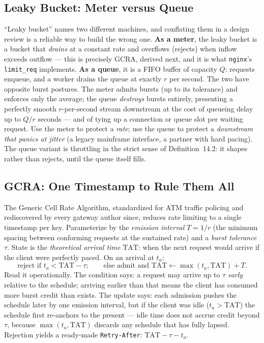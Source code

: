 \subsection{Leaky Bucket: Meter versus Queue}
\label{subsec:ch14-leaky-bucket}

``Leaky bucket'' names two different machines, and conflating them in a
design review is a reliable way to build the wrong one. \textbf{As a
meter}, the leaky bucket is a bucket that \emph{drains} at a constant rate
and overflows (rejects) when inflow exceeds outflow --- this is precisely
GCRA, derived next, and it is what \texttt{nginx}'s \texttt{limit\_req}
implements. \textbf{As a queue}, it is a FIFO buffer of capacity $Q$:
requests enqueue, and a worker drains the queue at exactly $r$ per second.
The two have opposite burst postures. The meter admits bursts (up to its
tolerance) and enforces only the average; the queue \emph{destroys} bursts
entirely, presenting a perfectly smooth $r$-per-second stream downstream at
the cost of queueing delay up to $Q/r$ seconds --- and of tying up a
connection or queue slot per waiting request. Use the meter to protect a
\emph{rate}; use the queue to protect a \emph{downstream that panics at
jitter} (a legacy mainframe interface, a partner with hard pacing). The
queue variant is throttling in the strict sense of
Definition~14.2: it shapes rather than rejects, until the queue itself
fills.

\subsection{GCRA: One Timestamp to Rule Them All}
\label{subsec:ch14-gcra}

The Generic Cell Rate Algorithm, standardized for ATM traffic policing and
rediscovered by every gateway author since, reduces rate limiting to a
single timestamp per key. Parameterize by the \emph{emission interval}
$T = 1/r$ (the minimum spacing between conforming requests at the sustained
rate) and a \emph{burst tolerance} $\tau$. State is the \emph{theoretical
arrival time} $\mathrm{TAT}$: when the next request would arrive if the
client were perfectly paced. On an arrival at $t_a$:
\begin{equation}
  \text{reject if } t_a < \mathrm{TAT} - \tau;
  \qquad
  \text{else admit and } \mathrm{TAT} \leftarrow \max(t_a, \mathrm{TAT}) + T.
  \label{eq:ch14-gcra}
\end{equation}
Read it operationally. The condition says: a request may arrive up to $\tau$
\emph{early} relative to the schedule; arriving earlier than that means the
client has consumed more burst credit than exists. The update says: each
admission pushes the schedule later by one emission interval, but if the
client was idle ($t_a > \mathrm{TAT}$) the schedule first re-anchors to the
present --- idle time does not accrue credit beyond $\tau$, because
$\max(t_a, \mathrm{TAT})$ discards any schedule that has fully lapsed.
Rejection yields a ready-made \texttt{Retry-After}: $\mathrm{TAT} - \tau - t_a$.

